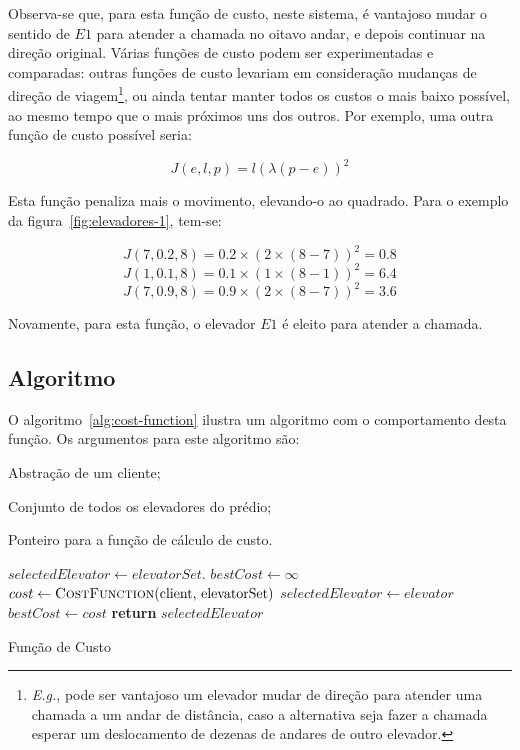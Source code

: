 Observa-se que, para esta função de custo, neste sistema, é vantajoso mudar o
sentido de $E1$ para atender a chamada no oitavo andar, e depois continuar na
direção original. Várias funções de custo podem ser experimentadas e comparadas:
outras funções de custo levariam em consideração mudanças de direção de
viagem\footnote{\textit{E.g.}, pode ser vantajoso um elevador mudar de direção
para atender uma chamada a um andar de distância, caso a alternativa seja fazer a
chamada esperar um deslocamento de dezenas de andares de outro elevador.}, ou
ainda tentar manter todos os custos o mais baixo possível, ao mesmo tempo que o
mais próximos uns dos outros. Por exemplo, uma outra função de custo possível
seria:

\[J(e, l, p) = l(\lambda(p - e))^{2}\]

Esta função penaliza mais o movimento, elevando-o ao quadrado. Para o exemplo da
figura~\ref{fig:elevadores-1}, tem-se:

\[J(7, 0.2, 8) = 0.2 \times (2 \times (8-7))^2 = 0.8\]
\[J(1, 0.1, 8) = 0.1 \times (1 \times (8-1))^2 = 6.4\]
\[J(7, 0.9, 8) = 0.9 \times (2 \times (8-7))^2 = 3.6\]

Novamente, para esta função, o elevador $E1$ é eleito para atender a chamada.

\subsection{Algoritmo}

O algoritmo~\ref{alg:cost-function} ilustra um algoritmo com o comportamento desta
função. Os argumentos para este algoritmo são:

\newpage

\begin{description}[leftmargin=!,labelwidth=\widthof{\bfseries $costFunction$}]
  \item[$client$] Abstração de um cliente;
  \item[$elevatorset$] Conjunto de todos os elevadores do prédio;
  \item[$costFunction$] Ponteiro para a função de cálculo de custo.
\end{description}

\begin{algorithm}[htb]
\begin{center}
\begin{algorithmic}[1]
  \State $selectedElevator \leftarrow elevatorSet.$
  \State $bestCost \leftarrow \infty$
    \State $cost \leftarrow \Call{CostFunction}{$client, elevatorSet$}$
      \State $selectedElevator \leftarrow elevator$
      \State $bestCost \leftarrow cost$
    \EndIf
  \EndFor
  \State \textbf{return} $selectedElevator$
\EndFunction
\end{algorithmic}
\end{center}
\caption
   {\label{alg:cost-function}Função de Custo}
\end{algorithm}

